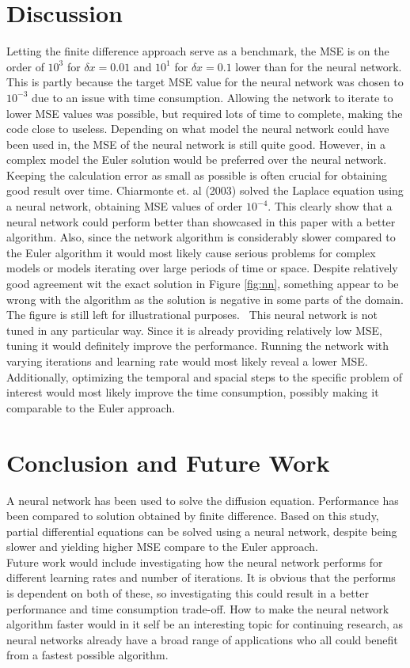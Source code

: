 \documentclass[a4paper,11pt,twocolumn]{article}
\begin{document}
\section{Discussion}
Letting the finite difference approach serve as a benchmark, the MSE is on the order of $10^3$ for $\delta x = 0.01$ and $10^1$ for $\delta x = 0.1$ lower than for the neural network. This is partly because the target MSE value for the neural network was chosen to $10^{-3}$ due to an issue with time consumption. Allowing the network to iterate to lower MSE values was possible, but required lots of time to complete, making the code close to useless. Depending on what model the neural network could have been used in, the MSE of the neural network is still quite good. However, in a complex model the Euler solution would be preferred over the neural network. Keeping the calculation error as small as possible is often crucial for obtaining good result over time. Chiarmonte et. al (2003) \cite{kie} solved the Laplace equation using a neural network, obtaining MSE values of order $10^{-4}$. This clearly show that a neural network could perform better than showcased in this paper with a better algorithm. Also, since the network algorithm is considerably slower compared to the Euler algorithm it would most likely cause serious problems for complex models or models iterating over large periods of time or space. Despite relatively good agreement wit the exact solution in Figure \ref{fig:nn}, something appear to be wrong with the algorithm as the solution is negative in some parts of the domain. The figure is still left for illustrational purposes.  
\
This neural network is not tuned in any particular way. Since it is already providing relatively low MSE, tuning it would definitely improve the performance. Running the network with varying iterations and learning rate would most likely reveal a lower MSE. Additionally, optimizing the temporal and spacial steps to the specific problem of interest would most likely improve the time consumption, possibly making it comparable to the Euler approach.      

\section{Conclusion and Future Work}

A neural network has been used to solve the diffusion equation. Performance has been compared to solution obtained by finite difference. Based on this study, partial differential equations can be solved using a neural network, despite being slower and yielding higher MSE compare to the Euler approach. 
\\
Future work would include investigating how the neural network performs for different learning rates and number of iterations. It is obvious that the performs is dependent on both of these, so investigating this could result in a better performance and time consumption trade-off. How to make the neural network algorithm faster would in it self be an interesting topic for continuing research, as neural networks already have a broad range of applications who all could benefit from a fastest possible algorithm. 
\end{document}
